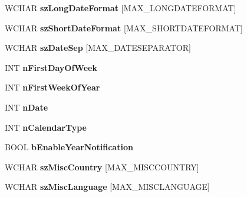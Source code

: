 \begin{DoxyCompactItemize}
W\+C\+H\+AR {\bfseries sz\+Long\+Date\+Format} \mbox{[}M\+A\+X\+\_\+\+L\+O\+N\+G\+D\+A\+T\+E\+F\+O\+R\+M\+AT\mbox{]}
\item 
\mbox{\label{struct___g_l_o_b_a_l_d_a_t_a_a23bcf63476cf73e73317b76de921bf9e}} 
W\+C\+H\+AR {\bfseries sz\+Short\+Date\+Format} \mbox{[}M\+A\+X\+\_\+\+S\+H\+O\+R\+T\+D\+A\+T\+E\+F\+O\+R\+M\+AT\mbox{]}
\item 
\mbox{\label{struct___g_l_o_b_a_l_d_a_t_a_a7b2f4fd209c07216c509111c5e227b2e}} 
W\+C\+H\+AR {\bfseries sz\+Date\+Sep} \mbox{[}M\+A\+X\+\_\+\+D\+A\+T\+E\+S\+E\+P\+A\+R\+A\+T\+OR\mbox{]}
\item 
\mbox{\label{struct___g_l_o_b_a_l_d_a_t_a_a940099837124f372607a883f91575c06}} 
I\+NT {\bfseries n\+First\+Day\+Of\+Week}
\item 
\mbox{\label{struct___g_l_o_b_a_l_d_a_t_a_a8003ec7d47aa3a089340d85d1cb6a18a}} 
I\+NT {\bfseries n\+First\+Week\+Of\+Year}
\item 
\mbox{\label{struct___g_l_o_b_a_l_d_a_t_a_aa01eeb91361d8fc858d90b504b296686}} 
I\+NT {\bfseries n\+Date}
\item 
\mbox{\label{struct___g_l_o_b_a_l_d_a_t_a_a285266bd56abc094d32749b153cdffc1}} 
I\+NT {\bfseries n\+Calendar\+Type}
\item 
\mbox{\label{struct___g_l_o_b_a_l_d_a_t_a_a98736f1d9c8d44404784266b29887617}} 
B\+O\+OL {\bfseries b\+Enable\+Year\+Notification}
\item 
\mbox{\label{struct___g_l_o_b_a_l_d_a_t_a_aec6f67debfef5bd7b28424b6aa07af28}} 
W\+C\+H\+AR {\bfseries sz\+Misc\+Country} \mbox{[}M\+A\+X\+\_\+\+M\+I\+S\+C\+C\+O\+U\+N\+T\+RY\mbox{]}
\item 
\mbox{\label{struct___g_l_o_b_a_l_d_a_t_a_a9691f4dbcc042c20b7523913fe011224}} 
W\+C\+H\+AR {\bfseries sz\+Misc\+Language} \mbox{[}M\+A\+X\+\_\+\+M\+I\+S\+C\+L\+A\+N\+G\+U\+A\+GE\mbox{]}
\item 

\end{DoxyCompactItemize}
